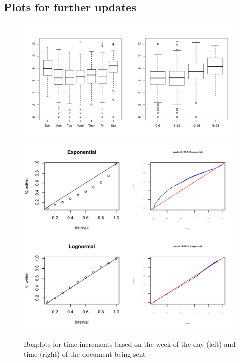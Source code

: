                                   \subsection{Plots for further updates}\label{subsec:futureplot}           
               \begin{figure}[ht]
               	\centering
               	\includegraphics[width=1\textwidth]{plots/weekdays.pdf}
               	           	           	\includegraphics[width=1\textwidth]{plots/Exp_vs_Lognormal.pdf}    
               	\label{fig:dayweekplot}
               	\caption{Boxplots for time-increments based on the week of the day (left) and time (right) of the document being sent}
               \end{figure}
                       
             

